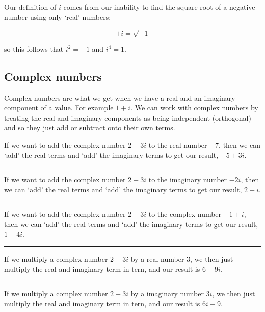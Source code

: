 \documentclass[
]{book}
\begin{document}
Our definition of \(i\) comes from our inability to find the square root of a negative number using only `real' numbers:

\begin{equation}
\pm i = \sqrt{-1}
\label{eq:imaginary}
\end{equation}

so this follows that \(i^2 = -1\) and \(i^4 = 1\).

\hypertarget{subsec:complex}{%
\subsection{Complex numbers}\label{subsec:complex}}

Complex numbers are what we get when we have a real and an imaginary component of a value. For example \(1 + i\). We can work with complex numbers by treating the real and imaginary components as being independent (orthogonal) and so they just add or subtract onto their own terms.

If we want to add the complex number \(2 + 3i\) to the real number \(-7\), then we can `add' the real terms and `add' the imaginary terms to get our result, \(-5+3i\).

\begin{center}\rule{0.5\linewidth}{0.5pt}\end{center}

If we want to add the complex number \(2 + 3i\) to the imaginary number \(-2i\), then we can `add' the real terms and `add' the imaginary terms to get our result, \(2+i\).

\begin{center}\rule{0.5\linewidth}{0.5pt}\end{center}

If we want to add the complex number \(2 + 3i\) to the complex number \(-1+i\), then we can `add' the real terms and `add' the imaginary terms to get our result, \(1+4i\).

\begin{center}\rule{0.5\linewidth}{0.5pt}\end{center}

If we multiply a complex number \(2 + 3i\) by a real number \(3\), we then just multiply the real and imaginary term in tern, and our result is \(6+ 9i\).

\begin{center}\rule{0.5\linewidth}{0.5pt}\end{center}

If we multiply a complex number \(2 + 3i\) by a imaginary number \(3i\), we then just multiply the real and imaginary term in tern, and our result is \(6i-9\).
\end{document}
